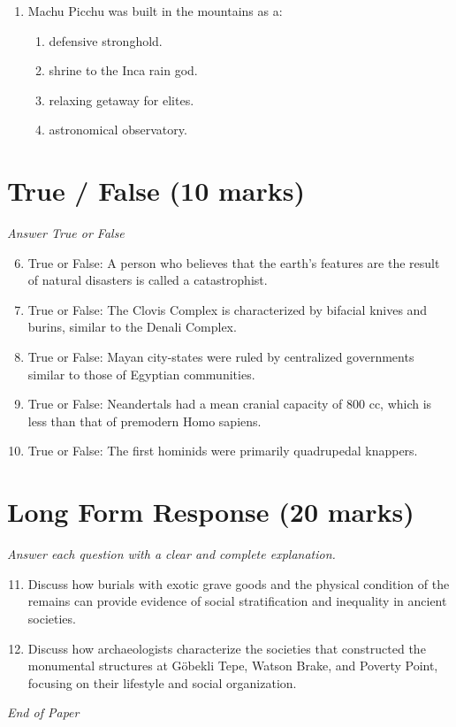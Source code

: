 \documentclass[12pt]{article}
\begin{document}
\begin{enumerate}[label=\arabic*.]
\begin{enumerate}[label=(\alph*)]
    \item multicultural adaptation.
    \item multilineal evolution.
\end{enumerate}
\item Machu Picchu was built in the mountains as a:
\begin{enumerate}[label=(\alph*)]
    \item defensive stronghold.
    \item shrine to the Inca rain god.
    \item relaxing getaway for elites.
    \item astronomical observatory.
\end{enumerate}
\end{enumerate}

\section*{True / False (10 marks)}
\textit{Answer True or False}
\begin{enumerate}[label=\arabic*.]
\setcounter{enumi}{5}
\item True or False: A person who believes that the earth's features are the result of natural disasters is called a catastrophist.
\item True or False: The Clovis Complex is characterized by bifacial knives and burins, similar to the Denali Complex.
\item True or False: Mayan city-states were ruled by centralized governments similar to those of Egyptian communities.
\item True or False: Neandertals had a mean cranial capacity of 800 cc, which is less than that of premodern Homo sapiens.
\item True or False: The first hominids were primarily quadrupedal knappers.
\end{enumerate}

\section*{Long Form Response (20 marks)}
\textit{Answer each question with a clear and complete explanation.}
\begin{enumerate}[label=\arabic*.]
\setcounter{enumi}{10}
\item Discuss how burials with exotic grave goods and the physical condition of the remains can provide evidence of social stratification and inequality in ancient societies.
\item Discuss how archaeologists characterize the societies that constructed the monumental structures at Göbekli Tepe, Watson Brake, and Poverty Point, focusing on their lifestyle and social organization.
\end{enumerate}

\vfill
\noindent\textit{End of Paper}
\end{document}
